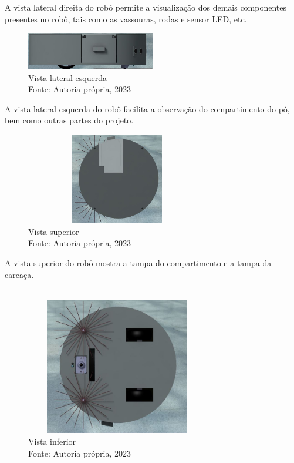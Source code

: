 A vista lateral direita do robô permite a visualização dos demais componentes presentes no robô, tais como as vassouras, rodas e sensor LED, etc.
\\
\newpage
\pagebreak
\begin{figure}[h!]
\centering
\includegraphics[width=0.5\textwidth]{figuras/esquerda.jpg}
\caption{Vista lateral esquerda\\Fonte: Autoria própria, 2023}
\label{vistaLateral}
\end{figure}

A vista lateral esquerda do robô facilita a observação do compartimento do pó, bem como outras partes do projeto.
\\
\begin{figure}[h!]
\centering
\includegraphics[width=8cm,height=4cm]{figuras/superior.jpg}
\caption{Vista superior\\Fonte: Autoria própria, 2023}
\label{vistaLateral}
\end{figure}


 A vista superior do robô mostra a tampa do compartimento e a tampa da carcaça. 
 \\
 \\
\begin{figure}[h!]
\centering
\includegraphics[width=8cm,height=6cm]{figuras/inferior.jpg}
\caption{Vista inferior\\Fonte: Autoria própria, 2023}
\label{vistaLateral}
\end{figure}


